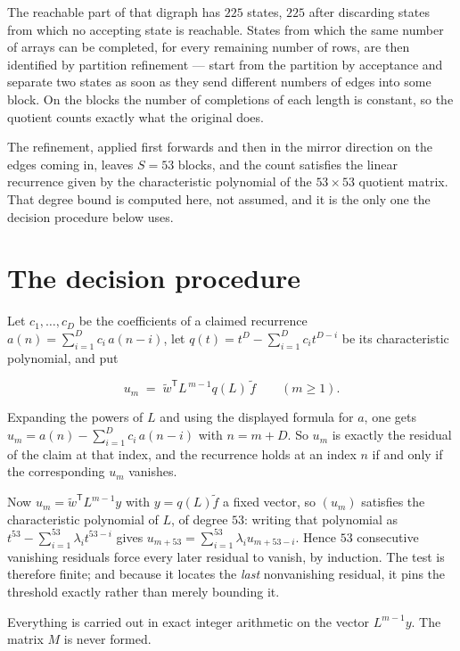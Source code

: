 \documentclass[11pt]{article}
\theoremstyle{definition}
\begin{document}
The reachable part of that digraph has $225$ states, $225$ after discarding states from which no accepting state is reachable. States from which the same number of arrays can be completed, for every remaining number of rows, are then identified by partition refinement --- start from the partition by acceptance and separate two states as soon as they send different numbers of edges into some block. On the blocks the number of completions of each length is constant, so the quotient counts exactly what the original does.

The refinement, applied first forwards and then in the mirror direction on the edges coming in, leaves $S = 53$ blocks, and the count satisfies the linear recurrence given by the characteristic polynomial of the $53 \times 53$ quotient matrix. That degree bound is computed here, not assumed, and it is the only one the decision procedure below uses.

\section{The decision procedure}

Let $c_1,\dots,c_D$ be the coefficients of a claimed recurrence $a(n) = \sum_{i=1}^{D} c_i\,a(n-i)$, let $q(t) = t^{D} - \sum_{i=1}^{D} c_i t^{D-i}$ be its characteristic polynomial, and put

\[u_m \;=\; \tilde w^{\mathsf T} L^{\,m-1} q(L)\,\tilde f \qquad (m \ge 1).\]

Expanding the powers of $L$ and using the displayed formula for $a$, one gets $u_m = a(n) - \sum_{i=1}^{D} c_i\,a(n-i)$ with $n = m + D$. So $u_m$ is exactly the residual of the claim at that index, and the recurrence holds at an index $n$ if and only if the corresponding $u_m$ vanishes.

Now $u_m = \tilde w^{\mathsf T} L^{m-1} y$ with $y = q(L)\tilde f$ a fixed vector, so $(u_m)$ satisfies the characteristic polynomial of $L$, of degree $53$: writing that polynomial as $t^{53} - \sum_{i=1}^{53} \lambda_i t^{53-i}$ gives $u_{m+53} = \sum_{i=1}^{53} \lambda_i u_{m+53-i}$. Hence $53$ consecutive vanishing residuals force every later residual to vanish, by induction. The test is therefore finite; and because it locates the {\itshape last} nonvanishing residual, it pins the threshold exactly rather than merely bounding it.

Everything is carried out in exact integer arithmetic on the vector $L^{m-1}y$. The matrix $M$ is never formed.
\end{document}
